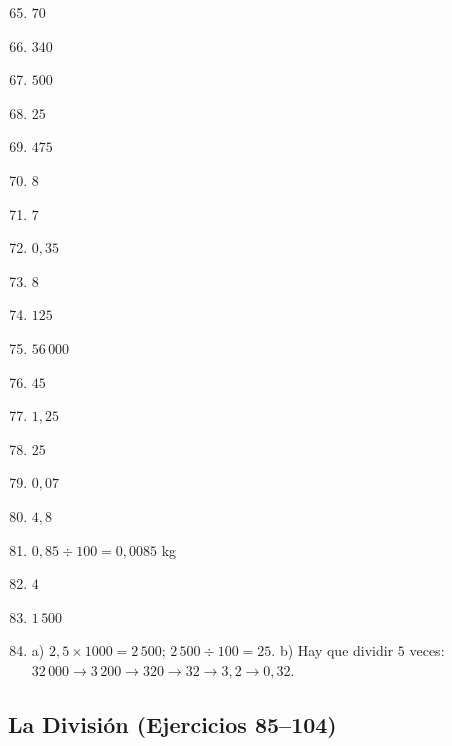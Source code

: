 \documentclass[12pt, letterpaper]{article}
\begin{document}
  \begin{enumerate}[leftmargin=*, label=\textbf{\arabic*.}]
    \setcounter{enumi}{64}
    \item $70$
    \item $340$
    \item $500$
    \item $25$
    \item $475$
    \item $8$
    \item $7$
    \item $0{,}35$
    \item $8$
    \item $125$
    \item $56\,000$
    \item $45$
    \item $1{,}25$
    \item $25$
    \item $0{,}07$
    \item $4{,}8$
    \item $0{,}85 \div 100 = 0{,}0085$ kg
    \item $4$
    \item $1\,500$
    \item a) $2{,}5 \times 1000 = 2\,500$; \quad $2\,500 \div 100 = 25$. \quad b) Hay que dividir $5$ veces: $32\,000 \to 3\,200 \to 320 \to 32 \to 3{,}2 \to 0{,}32$.
  \end{enumerate}

  \subsection*{La División (Ejercicios 85--104)}
\end{document}
